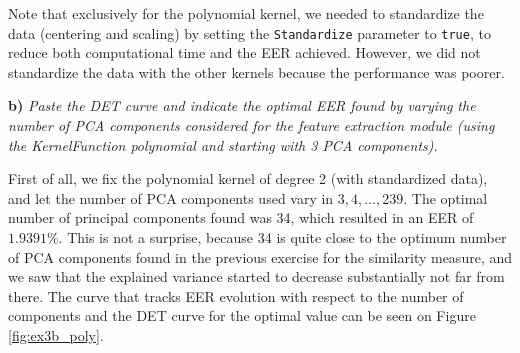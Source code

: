 \documentclass[11pt]{article}
\begin{document}
Note that exclusively for the polynomial kernel, we needed to standardize the data (centering and scaling) by setting the \verb|Standardize| parameter to \verb|true|, to reduce both computational time and the EER achieved. However, we did not standardize the data with the other kernels because the performance was poorer.

\textbf{b)} \textit{Paste the DET curve and indicate the optimal EER found by varying the number of PCA components considered for the feature extraction module (using the KernelFunction polynomial and starting with 3 PCA components).}

First of all, we fix the polynomial kernel of degree 2 (with standardized data), and let the number of PCA components used vary in $3,4,\dots, 239$. The optimal number of principal components found was 34, which resulted in an EER of $1.9391\%$. This is not a surprise, because 34 is quite close to the optimum number of PCA components found in the previous exercise for the similarity measure, and we saw that the explained variance started to decrease substantially not far from there. The curve that tracks EER evolution with respect to the number of components and the DET curve for the optimal value can be seen on Figure \ref{fig:ex3b_poly}.
\end{document}
